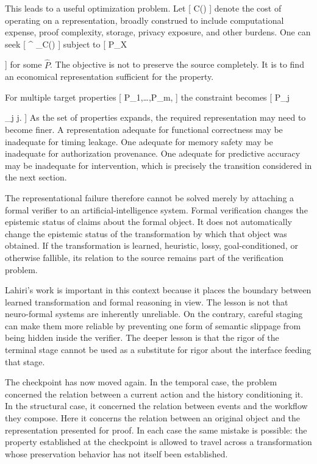 \documentclass[11pt]{article}
\begin{document}
This leads to a useful optimization problem. Let
[
C(\tau)
]
denote the cost of operating on a representation, broadly construed to include computational expense, proof complexity, storage, privacy exposure, and other burdens. One can seek
[
\tau^\star
\in
\arg\min_\tau C(\tau)
]
subject to
[
P_X

\circ\tau
]
for some $\widehat{P}$. The objective is not to preserve the source completely. It is to find an economical representation sufficient for the property.

For multiple target properties
[
P_1,\ldots,P_m,
]
the constraint becomes
[
P_j

_j\circ\tau
\qquad
{}j.
]
As the set of properties expands, the required representation may need to become finer. A representation adequate for functional correctness may be inadequate for timing leakage. One adequate for memory safety may be inadequate for authorization provenance. One adequate for predictive accuracy may be inadequate for intervention, which is precisely the transition considered in the next section.

The representational failure therefore cannot be solved merely by attaching a formal verifier to an artificial-intelligence system. Formal verification changes the epistemic status of claims about the formal object. It does not automatically change the epistemic status of the transformation by which that object was obtained. If the transformation is learned, heuristic, lossy, goal-conditioned, or otherwise fallible, its relation to the source remains part of the verification problem.

Lahiri's work is important in this context because it places the boundary between learned transformation and formal reasoning in view. The lesson is not that neuro-formal systems are inherently unreliable. On the contrary, careful staging can make them more reliable by preventing one form of semantic slippage from being hidden inside the verifier. The deeper lesson is that the rigor of the terminal stage cannot be used as a substitute for rigor about the interface feeding that stage.

The checkpoint has now moved again. In the temporal case, the problem concerned the relation between a current action and the history conditioning it. In the structural case, it concerned the relation between events and the workflow they compose. Here it concerns the relation between an original object and the representation presented for proof. In each case the same mistake is possible: the property established at the checkpoint is allowed to travel across a transformation whose preservation behavior has not itself been established.
\end{document}

